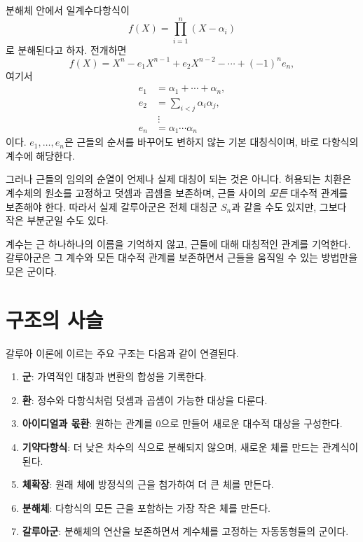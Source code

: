 분해체 안에서 일계수다항식이
\[
  f(X)=\prod_{i=1}^n(X-\alpha_i)
\]
로 분해된다고 하자. 전개하면
\[
  f(X)=X^n-e_1X^{n-1}+e_2X^{n-2}-\cdots+(-1)^ne_n,
\]
여기서
\[
\begin{aligned}
 e_1&=\alpha_1+\cdots+\alpha_n,\\
 e_2&=\sum_{i<j}\alpha_i\alpha_j,\\
 &\ \vdots\\
 e_n&=\alpha_1\cdots\alpha_n
\end{aligned}
\]
이다. $e_1,\dots,e_n$은 근들의 순서를 바꾸어도 변하지 않는 기본 대칭식이며, 바로 다항식의 계수에 해당한다.

그러나 근들의 임의의 순열이 언제나 실제 대칭이 되는 것은 아니다. 허용되는 치환은 계수체의 원소를 고정하고 덧셈과 곱셈을 보존하며, 근들 사이의 \emph{모든} 대수적 관계를 보존해야 한다. 따라서 실제 갈루아군은 전체 대칭군 $S_n$과 같을 수도 있지만, 그보다 작은 부분군일 수도 있다.

\begin{keyidea}
계수는 근 하나하나의 이름을 기억하지 않고, 근들에 대해 대칭적인 관계를 기억한다. 갈루아군은 그 계수와 모든 대수적 관계를 보존하면서 근들을 움직일 수 있는 방법만을 모은 군이다.
\end{keyidea}

\section{구조의 사슬}

갈루아 이론에 이르는 주요 구조는 다음과 같이 연결된다.

\begin{enumerate}
  \item \textbf{군}: 가역적인 대칭과 변환의 합성을 기록한다.
  \item \textbf{환}: 정수와 다항식처럼 덧셈과 곱셈이 가능한 대상을 다룬다.
  \item \textbf{아이디얼과 몫환}: 원하는 관계를 $0$으로 만들어 새로운 대수적 대상을 구성한다.
  \item \textbf{기약다항식}: 더 낮은 차수의 식으로 분해되지 않으며, 새로운 체를 만드는 관계식이 된다.
  \item \textbf{체확장}: 원래 체에 방정식의 근을 첨가하여 더 큰 체를 만든다.
  \item \textbf{분해체}: 다항식의 모든 근을 포함하는 가장 작은 체를 만든다.
  \item \textbf{갈루아군}: 분해체의 연산을 보존하면서 계수체를 고정하는 자동동형들의 군이다.
\end{enumerate}

